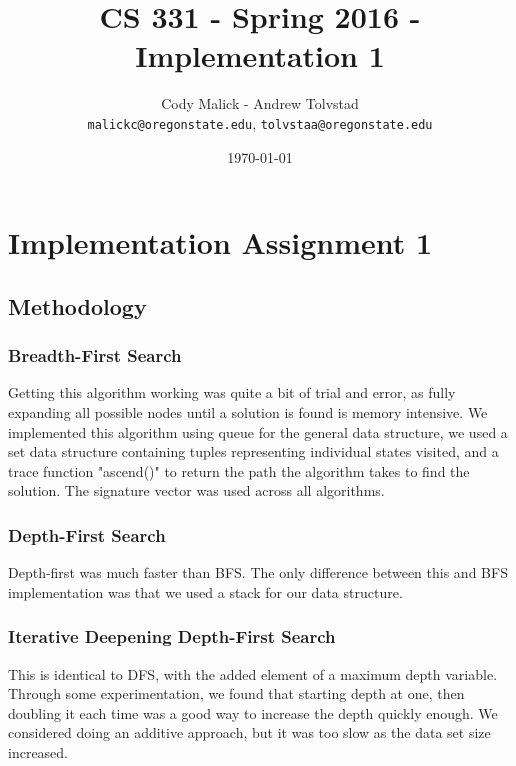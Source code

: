 \documentclass[10pt,letterpaper]{article}
\begin{document}
\begin{titlepage}
  \title{CS 331 - Spring 2016 - Implementation 1}
  \author{Cody Malick - Andrew Tolvstad\\
  \texttt{malickc@oregonstate.edu}, \texttt{tolvstaa@oregonstate.edu}}
  \date{\today}
  \maketitle
  \vspace*{2cm}

\end{titlepage}

\section{Implementation Assignment 1}
	\subsection{Methodology}
	\subsubsection{Breadth-First Search}
Getting this algorithm working was quite a bit of trial and error, as fully
expanding all possible nodes until a solution is found is memory intensive.
We implemented this algorithm using queue for the general data structure, we
used a set data structure containing tuples representing individual states
visited, and a trace function "ascend()" to return the path the algorithm takes
to find the solution. The signature vector was used across all algorithms.

	\subsubsection{Depth-First Search}
Depth-first was much faster than BFS. The only difference between this and BFS
implementation was that we used a stack for our data structure.

	\subsubsection{Iterative Deepening Depth-First Search}
This is identical to DFS, with the added element of a maximum depth variable.
Through some experimentation, we found that starting depth at one, then doubling
it each time was a good way to increase the depth quickly enough. We considered
doing an additive approach, but it was too slow as the data set size increased.
\end{document}
